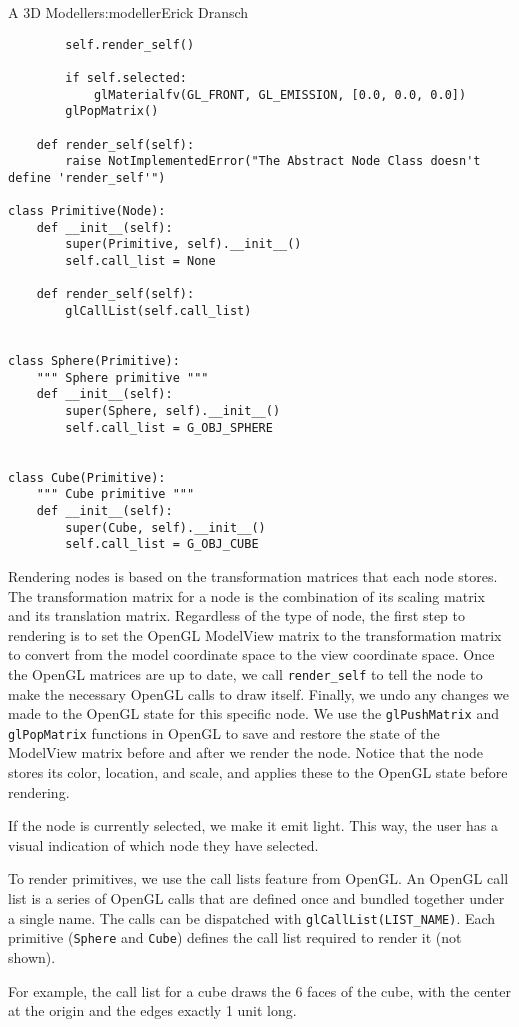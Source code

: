 \begin{aosachapter}{A 3D Modeller}{s:modeller}{Erick Dransch}
\begin{verbatim}
        self.render_self()

        if self.selected:
            glMaterialfv(GL_FRONT, GL_EMISSION, [0.0, 0.0, 0.0])
        glPopMatrix()

    def render_self(self):
        raise NotImplementedError("The Abstract Node Class doesn't define 'render_self'")

class Primitive(Node):
    def __init__(self):
        super(Primitive, self).__init__()
        self.call_list = None

    def render_self(self):
        glCallList(self.call_list)


class Sphere(Primitive):
    """ Sphere primitive """
    def __init__(self):
        super(Sphere, self).__init__()
        self.call_list = G_OBJ_SPHERE


class Cube(Primitive):
    """ Cube primitive """
    def __init__(self):
        super(Cube, self).__init__()
        self.call_list = G_OBJ_CUBE
\end{verbatim}

Rendering nodes is based on the transformation matrices that each node
stores. The transformation matrix for a node is the combination of its
scaling matrix and its translation matrix. Regardless of the type of
node, the first step to rendering is to set the OpenGL ModelView matrix
to the transformation matrix to convert from the model coordinate space
to the view coordinate space. Once the OpenGL matrices are up to date,
we call \texttt{render\_self} to tell the node to make the necessary
OpenGL calls to draw itself. Finally, we undo any changes we made to the
OpenGL state for this specific node. We use the \texttt{glPushMatrix}
and \texttt{glPopMatrix} functions in OpenGL to save and restore the
state of the ModelView matrix before and after we render the node.
Notice that the node stores its color, location, and scale, and applies
these to the OpenGL state before rendering.

If the node is currently selected, we make it emit light. This way, the
user has a visual indication of which node they have selected.

To render primitives, we use the call lists feature from OpenGL. An
OpenGL call list is a series of OpenGL calls that are defined once and
bundled together under a single name. The calls can be dispatched with
\texttt{glCallList(LIST\_NAME)}. Each primitive (\texttt{Sphere} and
\texttt{Cube}) defines the call list required to render it (not shown).

For example, the call list for a cube draws the 6 faces of the cube,
with the center at the origin and the edges exactly 1 unit long.


\end{aosachapter}
